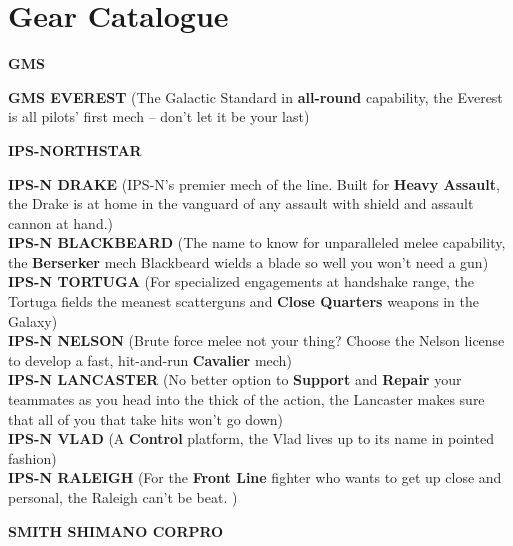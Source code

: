 \section{Gear Catalogue}

\begin{center}
  \textbf{GMS}
\end{center}  

\textbf{GMS EVEREST} (The Galactic Standard in \textbf{all-round} capability, the Everest is all pilots’ first mech -- don’t let it be your last)

\begin{center}
  \textbf{IPS-NORTHSTAR}
\end{center}  

\textbf{IPS-N DRAKE} (IPS-N’s premier mech of the line. Built for \textbf{Heavy Assault}, the Drake is at home in the vanguard of any assault with shield and assault cannon at hand.)\\ 
\textbf{IPS-N BLACKBEARD} (The name to know for unparalleled melee capability, the \textbf{Berserker} mech Blackbeard wields a blade so well you won’t need a gun)\\
\textbf{IPS-N TORTUGA} (For specialized engagements at handshake range, the Tortuga fields the meanest scatterguns and \textbf{Close Quarters} weapons in the Galaxy)\\
\textbf{IPS-N NELSON} (Brute force melee not your thing? Choose the Nelson license to develop a fast, hit-and-run \textbf{Cavalier} mech)\\
\textbf{IPS-N LANCASTER} (No better option to \textbf{Support} and \textbf{Repair} your teammates as you head into the thick of the action, the Lancaster makes sure that all of you that take hits won’t go down)\\
\textbf{IPS-N VLAD} (A \textbf{Control} platform, the Vlad lives up to its name in pointed fashion)\\
\textbf{IPS-N RALEIGH} (For the \textbf{Front Line} fighter who wants to get up close and personal, the Raleigh can’t be beat. )

\begin{center}
  \textbf{SMITH SHIMANO CORPRO}
\end{center}  

